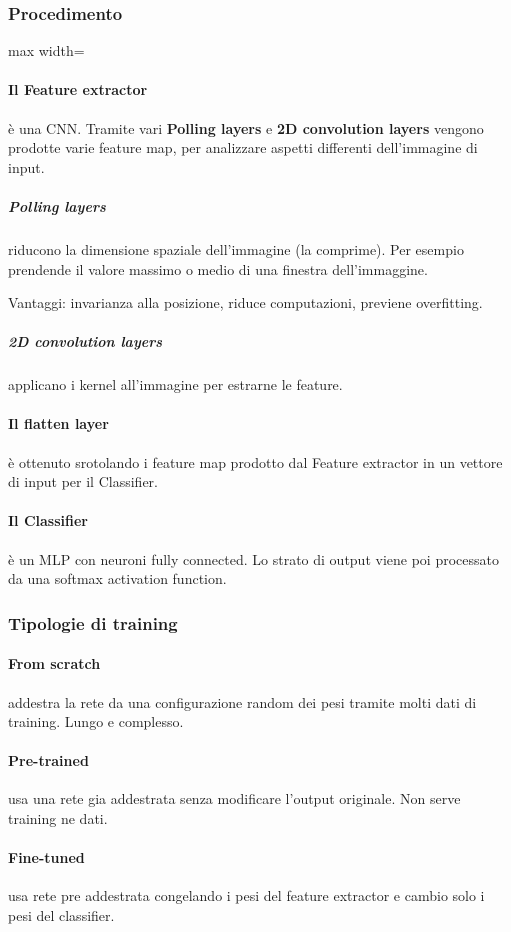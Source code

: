 \subsubsection{Procedimento}
\begin{center}
	\begin{adjustbox}{max width=\textwidth}
	\end{adjustbox}
\end{center}
\paragraph{Il Feature extractor} è una CNN. Tramite vari \textbf{Polling layers} e \textbf{2D convolution layers} vengono prodotte varie feature map, per analizzare aspetti differenti dell'immagine di input.
\subparagraph{Polling layers} riducono la dimensione spaziale dell'immagine (la comprime). Per esempio prendende il valore massimo o medio di una finestra dell'immaggine.

Vantaggi: invarianza alla posizione, riduce computazioni, previene overfitting.
\subparagraph{2D convolution layers} applicano i kernel all'immagine per estrarne le feature.
\paragraph{Il flatten layer} è ottenuto srotolando i feature map prodotto dal Feature extractor in un vettore di input per il Classifier.
\paragraph{Il Classifier} è un MLP con neuroni fully connected. Lo strato di output viene poi processato da una softmax activation function.
\subsubsection{Tipologie di training}
\paragraph{From scratch} addestra la rete da una configurazione random dei pesi tramite molti dati di training. Lungo e complesso.
\paragraph{Pre-trained} usa una rete gia addestrata senza modificare l'output originale. Non serve training ne dati.
\paragraph{Fine-tuned} usa rete pre addestrata congelando i pesi del feature extractor e cambio solo i pesi del classifier.